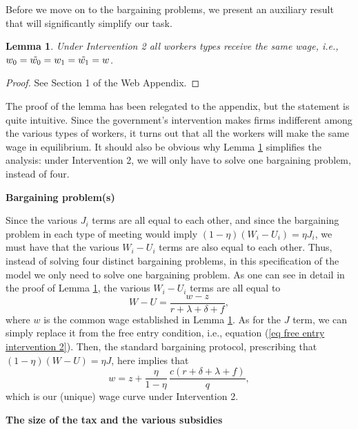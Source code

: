 \documentclass[12pt]{article} %
\newtheorem{lemma}[theorem]{Lemma}
\theoremstyle{definition}
\begin{document}
Before we move on to the bargaining problems, we present an auxiliary result that will significantly simplify our task.

\begin{lemma}\label{lemma all ws the same}
Under Intervention 2 all workers types receive the same wage, i.e., $w_0=\Tilde{w_0}=w_1=\Tilde{w_1}=w$.     \end{lemma}
\begin{proof}
See Section 1 of the Web Appendix.
\end{proof}

The proof of the lemma has been relegated to the appendix, but the statement is quite intuitive. Since the government's intervention makes firms indifferent among the various types of workers, it turns out that all the workers will make the same wage in equilibrium. It should also be obvious why Lemma \ref{lemma all ws the same} simplifies the analysis: under Intervention 2, we will only have to solve one bargaining problem, instead of four. 

\bigskip 

\noindent \textbf{Bargaining problem(s)}

Since the various $J_i$ terms are all equal to each other, and since the bargaining problem in each type of meeting would imply $(1-\eta)(W_i-U_i)=\eta J_i$, we must have that the various $W_i-U_i$ terms are also equal to each other. Thus, instead of solving four distinct bargaining problems, in this specification of the model we only need to solve one bargaining problem. As one can see in detail in the proof of Lemma \ref{lemma all ws the same}, the various $W_i-U_i$ terms are all equal to 
$$
W-U= \frac{w-z}{r+\lambda+\delta+f},   
$$where $w$ is the common wage established in Lemma \ref{lemma all ws the same}. As for the $J$ term, we can simply replace it from the free entry condition, i.e., equation (\ref{eq free entry intervention 2}). Then, the standard bargaining protocol, prescribing that $(1-\eta)(W-U)=\eta J$, here implies that
\begin{equation}
w = z + \frac{\eta}{1-\eta} \, \frac{c(r+\delta+\lambda+f)}{q}, \label{eq wage curve inter 2} 
\end{equation}which is our (unique) wage curve under Intervention 2. 


\bigskip 

\noindent \textbf{The size of the tax and the various subsidies}
\end{document}
